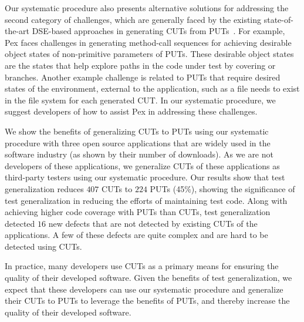 Our systematic procedure also presents alternative solutions for addressing the second category of challenges, which are generally faced by the existing state-of-the-art DSE-based approaches in generating CUTs from PUTs~\cite{thummalapenta09:mseqgen}. For example, Pex faces challenges in generating method-call sequences for achieving desirable object states of non-primitive parameters of PUTs. These desirable object states are the states that help explore paths in the code under test by covering  or  branches. Another example challenge is related to PUTs that require desired states of the environment, external to the application, such as a file needs to exist in the file system for each
generated CUT. In our systematic procedure, we suggest developers of how to assist Pex in addressing these challenges.

We show the benefits of generalizing CUTs to PUTs using our systematic procedure with three open source applications that are widely used in the software industry (as shown by their number of downloads). As we are not developers of these applications, we generalize CUTs of these applications as third-party testers using our systematic procedure. Our results show that test generalization reduces $407$ CUTs to $224$ PUTs (45\%), showing the significance of test generalization in reducing the efforts of maintaining test code. 
Along with achieving higher code coverage with PUTs than CUTs, test generalization detected $16$ new defects that are not detected by existing CUTs of the applications. A few of these defects are quite complex and are hard to be detected using CUTs. 

In practice, many developers use CUTs as a primary means for ensuring the quality of their developed software. Given the benefits of test generalization, we expect that these developers can use our systematic procedure and generalize their CUTs to PUTs to leverage the benefits of PUTs, and thereby increase the quality of their developed software.

